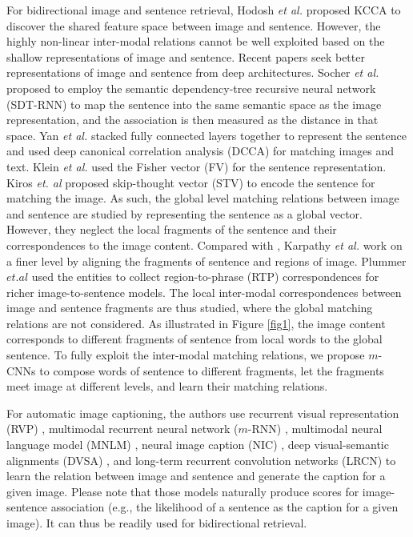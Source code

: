 \documentclass[10pt,twocolumn,letterpaper]{article}
\begin{document}
For bidirectional image and sentence retrieval, Hodosh \textit{et al.} \cite{hodosh_jair2013}  proposed KCCA to discover the shared feature space between image and sentence. However, the highly non-linear inter-modal relations cannot be well exploited based on the shallow representations of image and sentence.
Recent papers seek better representations of image and sentence from deep architectures. Socher \textit{et al.}  \cite{socher_tacl2014} proposed to employ the semantic dependency-tree recursive neural network (SDT-RNN) to map the sentence into the same semantic space as the image representation, and the association is then measured as the distance in that space. Yan \textit{et al.} \cite{yan_cvpr2015} stacked fully connected layers together to represent the sentence and used deep canonical correlation analysis (DCCA) for matching images and text. Klein \textit{et al.} \cite{klein_cvpr2015} used the Fisher vector (FV) for the sentence representation. Kiros \textit{et. al} \cite{kiros_2015} proposed skip-thought vector (STV) to encode the sentence for matching the image. As such, the global level matching relations between image and sentence are studied by representing the sentence as a global vector. However, they neglect the local fragments of the sentence and their correspondences to the image content. Compared with \cite{socher_tacl2014}, Karpathy \textit{et al.} \cite{karpathy_2014} work on a finer level by aligning the fragments of sentence and regions of image. Plummer $et. al$ \cite{plummer_2015} used the entities to collect region-to-phrase (RTP) correspondences for richer image-to-sentence models. The local inter-modal correspondences between image and sentence fragments are thus studied, where the global matching relations are not considered. As illustrated in Figure \ref{fig1}, the image content corresponds to different fragments of sentence from local words to the global sentence. To fully exploit the inter-modal matching relations,  we propose $m$-CNNs to compose words of sentence to different fragments, let the fragments meet image at different levels, and learn their matching relations.

For automatic image captioning,  the authors use recurrent visual representation (RVP) \cite{chen_2014}, multimodal recurrent neural network ($m$-RNN) \cite{mao_2014,mao_iclr_2015}, multimodal neural language model (MNLM) \cite{kiros_icml2014,kiros_2014}, neural image caption (NIC) \cite{vinyals_2014}, deep visual-semantic alignments (DVSA) \cite{karpathy_dvsa_2014}, and long-term recurrent convolution networks (LRCN) \cite{donahue_2014} to learn the relation between image and sentence and generate the caption for a given image. Please note that those models naturally produce scores for image-sentence association (e.g., the likelihood of a sentence as the caption for a given image). It can thus be readily used for bidirectional retrieval.
\end{document}

